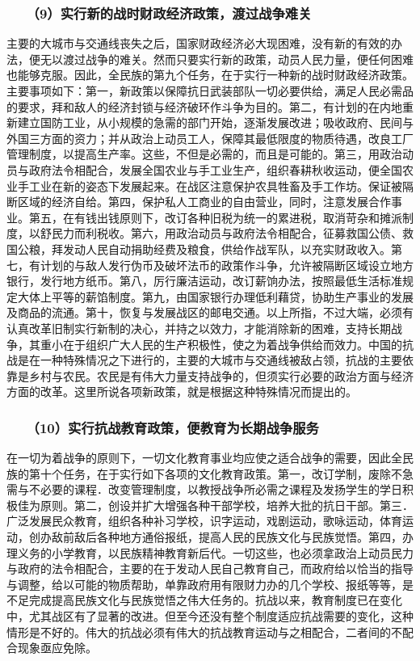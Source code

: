 \documentclass[cn,11pt,chinese]{elegantbook}
\def\myformat#1{\hfil\hfil #1}
\begin{document}
\subsubsection*{\myformat{　　（9）实行新的战时财政经济政策，渡过战争难关}}
主要的大城市与交通线丧失之后，国家财政经济必大现困难，没有新的有效的办法，便无以渡过战争的难关。然而只要实行新的政策，动员人民力量，便任何困难也能够克服。因此，全民族的第九个任务，在于实行一种新的战时财政经济政策。主要事项如下：第一，新政策以保障抗日武装部队一切必要供给，满足人民必需品的要求，拜和敌人的经济封锁与经济破环作斗争为目的。第二，有计划的在内地重新建立国防工业，从小规模的急需的部门开始，逐渐发展改进；吸收政府、民间与外国三方面的资力；并从政治上动员工人，保障其最低限度的物质待遇，改良工厂管理制度，以提高生产率。这些，不但是必需的，而且是可能的。第三，用政治动员与政府法令相配合，发展全国农业与手工业生产，组织春耕秋收运动，便全国农业手工业在新的姿态下发展起来。在战区注意保护农具牲畜及手工作坊。保证被隔断区域的经济自给。第四，保护私人工商业的自由营业，同时，注意发展合作事业。第五，在有钱出钱原则下，改订各种旧税为统一的累进税，取消苛杂和摊派制度，以舒民力而利税收。第六，用政治动员与政府法令相配合，征募救国公债、救国公粮，拜发动人民自动捐助经费及粮食，供给作战军队，以充实财政收入。第七，有计划的与敌人发行伪币及破坏法币的政策作斗争，允许被隔断区域设立地方银行，发行地方纸币。第八，厉行廉洁运动，改订薪饷办法，按照最低生活标准规定大体上平等的薪馅制度。第九，由国家银行办理低利藉贷，协助生产事业的发展及商品的流通。第十，恢复与发展战区的邮电交通。以上所指，不过大端，必须有认真改革旧制实行新制的决心，并持之以效力，才能消除新的困难，支持长期战争，其重小在于组织广大人民的生产积极性，使之为着战争供给而效力。中国的抗战是在一种特殊情况之下进行的，主要的大城市与交通线被敌占领，抗战的主要依靠是乡村与农民。农民是有伟大力量支持战争的，但须实行必要的政治方面与经济方面的改革。这里所说各项新政策，就是根据这种特殊情况而提出的。\\
\subsubsection*{\myformat{　　（10）实行抗战教育政策，便教育为长期战争服务}}
在一切为着战争的原则下，一切文化教育事业均应使之适合战争的需要，因此全民族的第十个任务，在于实行如下各项的文化教育政策。第一，改订学制，废除不急需与不必要的课程．改变管理制度，以教授战争所必需之课程及发扬学生的学日积极佳为原则。第二，创设并扩大增强各种干部学校，培养大批的抗日干部。第三．广泛发展民众教育，组织各种补习学校，识字运动，戏剧运动，歌咏运动，体育运动，创办敌前敌后各种地方通俗报纸，提高人民的民族文化与民族觉悟。第四，办理义务的小学教育，以民族精神教育新后代。一切这些，也必须拿政治上动员民力与政府的法令相配合，主要的在于发动人民自己教育自己，而政府给以恰当的指导与调整，给以可能的物质帮助，单靠政府用有限财力办的几个学校、报纸等等，是不足完成提高民族文化与民族觉悟之伟大任务的。抗战以来，教育制度已在变化中，尤其战区有了显著的改进。但至今还没有整个制度适应抗战需要的变化，这种情形是不好的。伟大的抗战必须有伟大的抗战教育运动与之相配合，二者间的不配合现象亟应免除。\\
\end{document}
